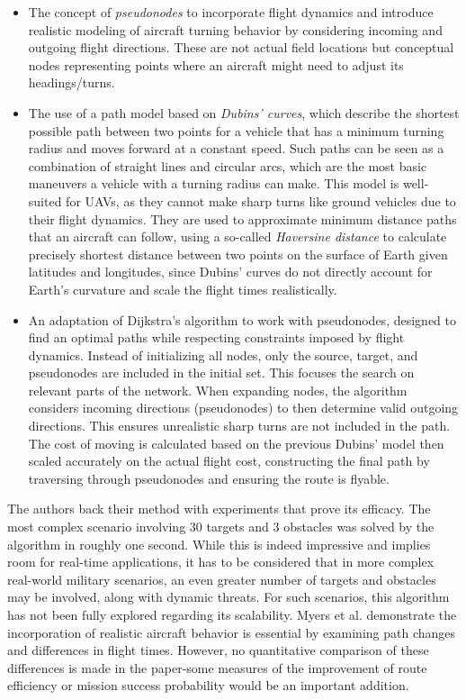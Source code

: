 \documentclass[conference]{IEEEtran}
\begin{document}
\begin{itemize}
    \item The concept of \textit{pseudonodes} to incorporate flight dynamics and introduce realistic modeling of aircraft turning behavior by considering incoming and outgoing flight directions. These are not actual field locations but conceptual nodes representing points where an aircraft might need to adjust its headings/turns.

    \item The use of a path model based on \textit{Dubins' curves}, which describe the shortest possible path between two points for a vehicle that has a minimum turning radius and moves forward at a constant speed. Such paths can be seen as a combination of straight lines and circular arcs, which are the most basic maneuvers a vehicle with a turning radius can make. This model is well-suited for UAVs, as they cannot make sharp turns like ground vehicles due to their flight dynamics. They are used to approximate minimum distance paths that an aircraft can follow, using a so-called \textit{Haversine distance} to calculate precisely shortest distance between two points on the surface of Earth given latitudes and longitudes, since Dubins' curves do not directly account for Earth's curvature and scale the flight times realistically.

    \item An adaptation of Dijkstra's algorithm to work with pseudonodes, designed to find an optimal paths while respecting constraints imposed by flight dynamics. Instead of initializing all nodes, only the source, target, and pseudonodes are included in the initial set. This focuses the search on relevant parts of the network. When expanding nodes, the algorithm considers incoming directions (pseudonodes) to then determine valid outgoing directions. This ensures unrealistic sharp turns are not included in the path. The cost of moving is calculated based on the previous Dubins' model then scaled accurately on the actual flight cost, constructing the final path by traversing through pseudonodes and ensuring the route is flyable.
    
\end{itemize}

The authors back their method with experiments that prove its efficacy. The most complex scenario involving $30$ targets and $3$ obstacles was solved by the algorithm in roughly one second. While this is indeed impressive and implies room for real-time applications, it has to be considered that in more complex real-world military scenarios, an even greater number of targets and obstacles may be involved, along with dynamic threats. For such scenarios, this algorithm has not been fully explored regarding its scalability.
Myers et al. demonstrate the incorporation of realistic aircraft behavior is essential by examining path changes and differences in flight times. However, no quantitative comparison of these differences is made in the paper-some measures of the improvement of route efficiency or mission success probability would be an important addition.
\end{document}
